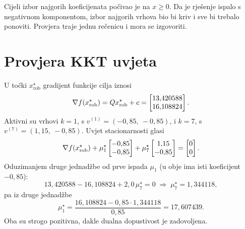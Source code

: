 \begin{zamka}
Cijeli izbor najgorih koeficijenata počivao je na $x \geq 0$. Da je rješenje
ispalo s negativnom komponentom, izbor najgorih vrhova bio bi kriv i sve bi
trebalo ponoviti. Provjera traje jednu rečenicu i mora se izgovoriti.
\end{zamka}

\section{Provjera KKT uvjeta}
\label{sec:z2-kkt}

\begin{korak}
U točki $x_{\mathrm{rob}}^{\star}$ gradijent funkcije cilja iznosi
\begin{equation}
\nabla f(x_{\mathrm{rob}}^{\star}) = Q x_{\mathrm{rob}}^{\star} + c
= \begin{bmatrix} 13{,}420588 \\ 16{,}108824 \end{bmatrix}.
\end{equation}
Aktivni su vrhovi $k = 1$, s $v^{(1)} = (-0{,}85,\ -0{,}85)$, i $k = 7$, s
$v^{(7)} = (1{,}15,\ -0{,}85)$. Uvjet stacionarnosti glasi
\begin{equation}
\nabla f(x_{\mathrm{rob}}^{\star})
+ \mu_1^{\star}\begin{bmatrix} -0{,}85 \\ -0{,}85 \end{bmatrix}
+ \mu_7^{\star}\begin{bmatrix} 1{,}15 \\ -0{,}85 \end{bmatrix}
= \begin{bmatrix} 0 \\ 0 \end{bmatrix}.
\end{equation}
Oduzimanjem druge jednadžbe od prve ispada $\mu_1$ (u obje ima isti koeficijent
$-0{,}85$):
\begin{equation}
13{,}420588 - 16{,}108824 + 2{,}0\,\mu_7^{\star} = 0
\;\Longrightarrow\;
\mu_7^{\star} = 1{,}344118,
\end{equation}
pa iz druge jednadžbe
\begin{equation}
\mu_1^{\star} = \frac{16{,}108824 - 0{,}85 \cdot 1{,}344118}{0{,}85} = 17{,}607439 .
\end{equation}
Oba su strogo pozitivna, dakle dualna dopustivost je zadovoljena.
\end{korak}

